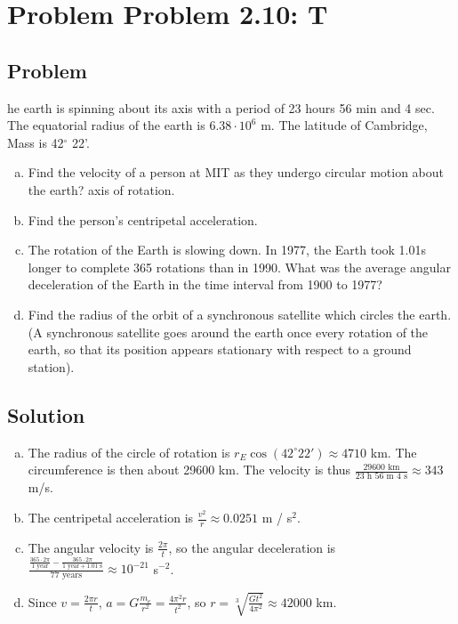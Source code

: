 \documentclass[solutions]{esg8012pset}
\begin{document}
\section*{Problem Problem 2.10: T}
\subsection*{Problem}
he earth is spinning about its axis with a period of 23 hours 56 min and 4 sec. The equatorial radius of the earth is $6.38\cdot 10^{6}$ m. The latitude of Cambridge, Mass is 42$^{\circ}$ 22'.
  \begin{enumerate}[a)]
    \item Find the velocity of a person at MIT as they undergo circular motion about the earth? axis of rotation.
    \item Find the person's centripetal acceleration.
    \item The rotation of the Earth is slowing down. In 1977, the Earth took 1.01s longer to complete 365 rotations than in 1990. What was the average angular deceleration of the Earth in the time interval from 1900 to 1977?
    \item Find the radius of the orbit of a synchronous satellite which circles the earth. (A synchronous satellite goes around the earth once every rotation of the earth, so that its position appears stationary with respect to a ground station).
  \end{enumerate}
\subsection*{Solution}
  \begin{enumerate}[a)]
    \item The radius of the circle of rotation is $r_E \cos(42^{\circ} 22') \approx 4710$ km.  The circumference is then about 29600 km.  The velocity is thus $\frac{29600\text{ km}}{23\text{ h }56\text{ m }4\text{ s}} \approx 343$ m/s.
    \item The centripetal acceleration is $\frac{v^2}{r} \approx 0.0251$ m / s$^2$.
    \item The angular velocity is $\frac{2\pi}{t}$, so the angular deceleration is $\frac{\frac{365\cdot 2\pi}{1\text{ year}} - \frac{365\cdot 2\pi}{1\text{ year}+1.01\text{ s}}}{77\text{ years}} \approx 10^{-21}$ s$^{-2}$.
    \item Since $v = \frac{2\pi r}{t}$, $a = G\frac{m_e}{r^2} = \frac{4\pi^2 r}{t^2}$, so $r = \sqrt[3]{\frac{G t^2}{4\pi^2}} \approx 42000$ km.
  \end{enumerate}
\end{document}
